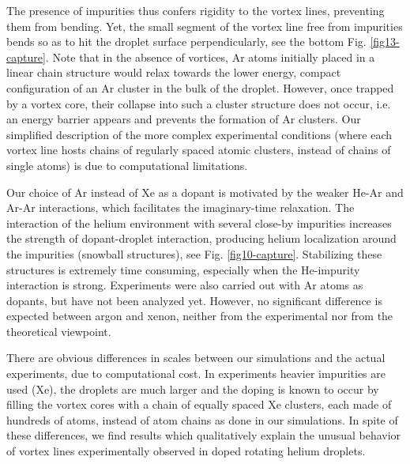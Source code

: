 The presence of impurities thus confers rigidity to the vortex lines,
preventing them from bending. Yet, the small segment of the vortex line free from impurities bends so as to hit 
the droplet surface perpendicularly, see the bottom Fig. \ref{fig13-capture}.
Note that in the absence of vortices, Ar atoms initially placed
in a linear chain structure would relax towards the lower energy, compact 
configuration of an Ar cluster in the bulk of the droplet.
However, once trapped by a vortex core, their collapse 
into such a cluster structure does not occur,
i.e. an energy barrier appears and prevents the formation of Ar
clusters. 
Our simplified 
description of the more complex experimental 
conditions (where each vortex line hosts chains of regularly spaced
atomic clusters, instead of chains of single atoms)
is due to computational limitations.

Our choice of Ar instead of Xe as a dopant is motivated by the weaker He-Ar and Ar-Ar interactions, which 
facilitates the imaginary-time relaxation. The interaction of the helium environment with several close-by impurities increases the 
strength of  dopant-droplet interaction, producing  
helium localization around the impurities (snowball structures), see Fig. \ref{fig10-capture}.  Stabilizing these
structures is extremely time consuming, 
especially when the He-impurity interaction is strong.
Experiments were also carried out with Ar atoms as dopants, 
but have not been analyzed yet.\citep{note}
However, no significant difference is expected between argon and xenon, 
neither from the experimental nor from the theoretical viewpoint.

There are obvious differences in scales between our simulations and  
 the actual experiments,  due to  computational 
cost. In experiments heavier impurities are used (Xe), 
the droplets are much larger
and the doping is known to occur by filling the vortex cores with a chain 
of equally spaced Xe clusters, each made of
hundreds of atoms, instead of atom chains as done in our simulations.
In spite of these differences, we find results which  
qualitatively explain the unusual behavior of vortex lines 
experimentally observed in doped rotating helium droplets.


